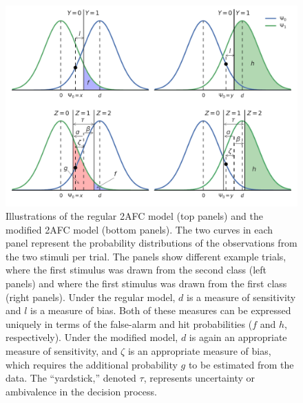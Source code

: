 \documentclass[man]{apa6}
\begin{document}
\begin{figure}
\includegraphics[width=1\textwidth]{fig2.pdf}
\caption{Illustrations of the regular 2AFC model (top panels) and the modified 2AFC model (bottom panels). The two curves in each panel represent the probability distributions of the observations from the two stimuli per trial. The panels show different example trials, where the first stimulus was drawn from the second class (left panels) and where the first stimulus was drawn from the first class (right panels). Under the regular model, $d$ is a measure of sensitivity and $l$ is a measure of bias. Both of these measures can be expressed uniquely in terms of the false-alarm and hit probabilities ($f$ and $h$, respectively). Under the modified model, $d$ is again an appropriate measure of sensitivity, and $\zeta$ is an appropriate measure of bias, which requires the additional probability $g$ to be estimated from the data. The ``yardstick,'' denoted $\tau$, represents uncertainty or ambivalence in the decision process.}
\label{fig:Figure2}
\end{figure}
\end{document}
